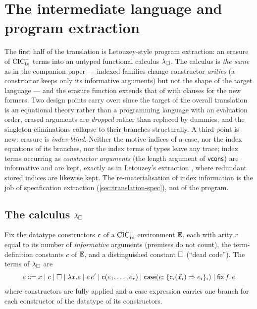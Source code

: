 \section{The intermediate language and program extraction}
\label{sec:lambdabox}

The first half of the translation is Letouzey-style program extraction:
an erasure of $\mathrm{CIC}^{-}_{\mathrm{ix}}$ terms into an untyped functional calculus $\lambda_{\square}$.
The calculus is \emph{the same} as in the companion paper --- indexed
families change constructor \emph{arities} (a constructor keeps only its
informative arguments) but not the shape of the target language --- and
the erasure function extends that of \cite{Extraction2026} with clauses
for the new formers.  Two design points carry over: since the target of
the overall translation is an equational theory rather than a programming
language with an evaluation order, erased arguments are \emph{dropped}
rather than replaced by dummies; and the singleton eliminations collapse
to their branches structurally.  A third point is new: erasure is
\emph{index-blind}.  Neither the motive indices of a case, nor the index
equations of its branches, nor the index terms of types leave any trace;
index terms occurring as \emph{constructor arguments} (the length
argument of $\mathsf{vcons}$) are informative and are kept, exactly as in
Letouzey's extraction \cite{Letouzey2003,Letouzey2008}, where redundant
stored indices are likewise kept.  The re-materialisation of index
information is the job of specification extraction
(\cref{sec:translation-spec}), not of the program.

\subsection{The calculus \texorpdfstring{$\lambda_{\square}$}{lambda-box}}

\begin{definition}
\label{def:lbox-syntax}
Fix the datatype constructors $\mathsf{c}$ of a $\mathrm{CIC}^{-}_{\mathrm{ix}}$ environment
$\mathbb{E}$, each with arity $r$ equal to its number of \emph{informative}
arguments (premises do not count), the term-definition constants $c$ of
$\mathbb{E}$, and a distinguished constant $\square$ (``dead code'').  The terms of
$\lambda_{\square}$ are
\[
  e \Coloneqq x \mid c \mid \square \mid \lambda x.e \mid e\,e'
    \mid \mathsf{c}(e_1, \dots, e_r)
    \mid \mathsf{case}(e;\, \{\mathsf{c}_i(\vec{x}_i) \Rightarrow e_i\}_i)
    \mid \mathsf{fix}\,f.\,e
\]
where constructors are fully applied and a case expression carries one
branch for each constructor of the datatype of its constructors.
\end{definition}

